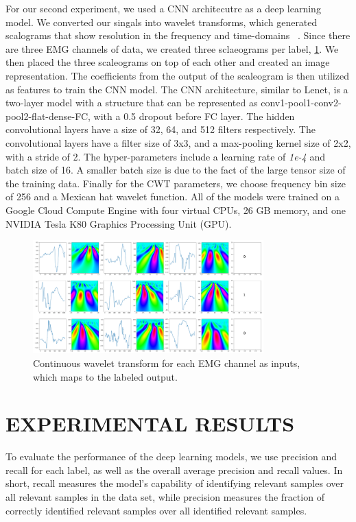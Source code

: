 \documentclass{article}
\begin{document}
For our second experiment, we used a CNN architecutre as a deep learning model. We converted our singals into wavelet transforms, which generated scalograms that show resolution in the frequency and time-domains ~\cite{wletCNN}. Since there are three EMG channels of data, we created three sclaeograms per label, \figurename \ref{fig: wavelet_signals}. We then placed the three scaleograms on top of each other and created an image representation. The coefficients from the output of the scaleogram is then utilized as features to train the CNN model. The CNN architecture, similar to Lenet, is a two-layer model with a structure that can be represented as conv1-pool1-conv2-pool2-flat-dense-FC, with a  0.5 dropout before FC layer. The hidden convolutional layers have a size of 32, 64, and 512 filters respectively. The convolutional layers have a filter size of 3x3, and a max-pooling kernel size of 2x2, with a stride of 2. The hyper-parameters include a learning rate of \textit{1e-4} and batch size of 16. A smaller batch size is due to the fact of the large tensor size of the training data. Finally for the CWT parameters, we choose frequency bin size of 256 and a Mexican hat wavelet function. All of the models were trained on a Google Cloud Compute Engine with four virtual CPUs, 26 GB memory, and one NVIDIA Tesla K80 Graphics Processing Unit (GPU).

\begin{figure}[!tb]
\centering
\includegraphics[width=3.5in]{images/wavelet_signal.png}
\caption{Continuous wavelet transform for each EMG channel as inputs, which maps to the labeled output.}
\label{fig: wavelet_signals}
\end{figure}

\section{EXPERIMENTAL RESULTS}
\label{sec:EXPERIMENTAL RESULTS}
To evaluate the performance of the deep learning models, we use precision and recall for each label, as well as the overall average precision and recall values. In short, recall measures the model's capability of identifying relevant samples over all relevant samples in the data set, while precision measures the fraction of correctly identified relevant samples over all identified relevant samples. 
\end{document}
